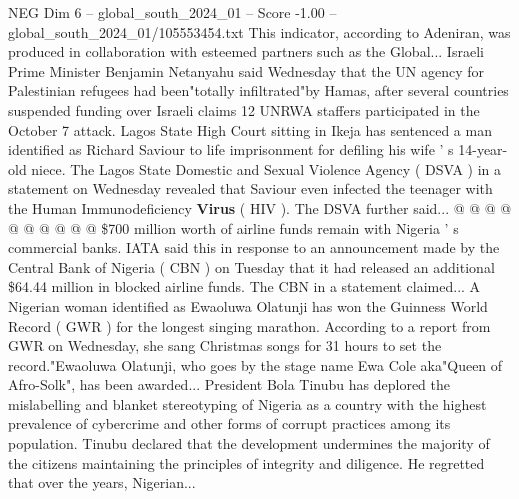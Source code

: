 \begin{textsample}{NEG Dim 6 – global\_south\_2024\_01 – Score -1.00 – global\_south\_2024\_01/105553454.txt}
This indicator, according to Adeniran, was produced in collaboration with esteemed partners such as the Global...
Israeli Prime Minister Benjamin Netanyahu said Wednesday that the UN agency for Palestinian refugees had been"totally infiltrated"by Hamas, after several countries suspended funding over Israeli claims 12 UNRWA staffers participated in the October 7 attack.
Lagos State High Court sitting in Ikeja has sentenced a man identified as Richard Saviour to life imprisonment for defiling his wife ' s 14-year-old niece.
The Lagos State Domestic and Sexual Violence Agency ( DSVA ) in a statement on Wednesday revealed that Saviour even infected the teenager with the Human Immunodeficiency \textbf{Virus} ( HIV ).
The DSVA further said... @ @ @ @ @ @ @ @ @ @ \$700 million worth of airline funds remain with Nigeria ' s commercial banks.
IATA said this in response to an announcement made by the Central Bank of Nigeria ( CBN ) on Tuesday that it had released an additional \$64.44 million in blocked airline funds.
The CBN in a statement claimed...
A Nigerian woman identified as Ewaoluwa Olatunji has won the Guinness World Record ( GWR ) for the longest singing marathon.
According to a report from GWR on Wednesday, she sang Christmas songs for 31 hours to set the record."Ewaoluwa Olatunji, who goes by the stage name Ewa Cole aka"Queen of Afro-Solk", has been awarded...
President Bola Tinubu has deplored the mislabelling and blanket stereotyping of Nigeria as a country with the highest prevalence of cybercrime and other forms of corrupt practices among its population.
Tinubu declared that the development undermines the majority of the citizens maintaining the principles of integrity and diligence.
He regretted that over the years, Nigerian...

\end{textsample}
